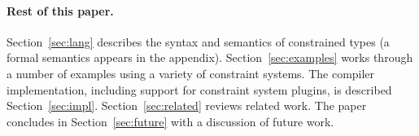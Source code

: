 
%

\paragraph{Rest of this paper.}

Section~\ref{sec:lang} describes the syntax and semantics of
constrained types (a formal semantics appears in the appendix).
Section~\ref{sec:examples} works through a number of
examples using a variety of constraint systems.
The compiler implementation, including support for constraint
system plugins, is  described Section~\ref{sec:impl}.
Section~\ref{sec:related} reviews related work.
The paper concludes in Section~\ref{sec:future}
with a discussion of future work.

